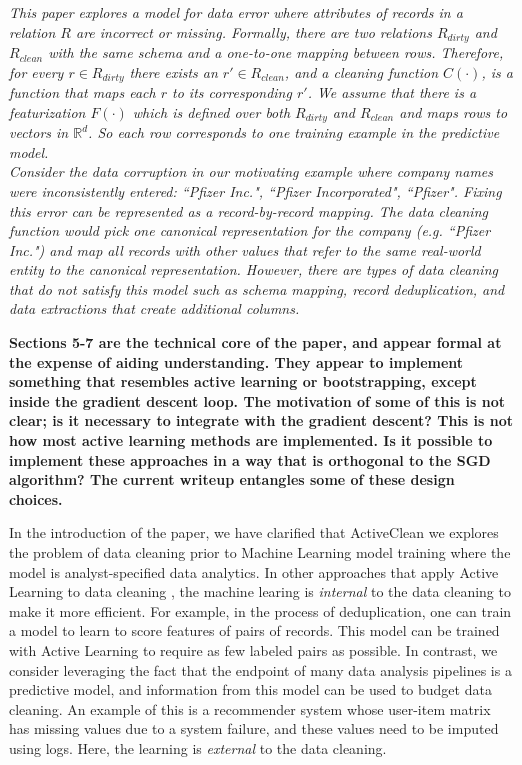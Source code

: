 \emph{This paper explores a model for data error where attributes of records in a relation $R$ are incorrect or missing.
Formally, there are two relations $R_{dirty}$ and $R_{clean}$ with the same schema and a one-to-one mapping between rows.
Therefore, for every $r \in R_{dirty}$ there exists an $r' \in R_{clean}$, and a cleaning function $C(\cdot)$, is a function that maps each $r$ to its corresponding $r'$.
We assume that there is a featurization $F(\cdot)$ which is defined over both $R_{dirty}$ and $R_{clean}$ and maps rows to vectors in $\mathbb{R}^d$.
So each row corresponds to one training example in the predictive model.\\
Consider the data corruption in our motivating example where company names were inconsistently entered: ``Pfizer Inc.", ``Pfizer Incorporated", ``Pfizer".
Fixing this error can be represented as a record-by-record mapping.
The data cleaning function would pick one canonical representation for the company (e.g. ``Pfizer Inc.") and map all records with other values that refer to the same real-world entity to the canonical representation.
However, there are types of data cleaning that do not satisfy this model such as schema mapping, record deduplication, and data extractions that create additional columns.}

\vspace{0.25em}

\textbf{Sections 5-7 are the technical core of the paper, and appear formal at the expense of aiding understanding. They appear to implement something that resembles active learning or bootstrapping, except inside the gradient descent loop. The motivation of some of this is not clear; is it necessary to integrate with the gradient descent? This is not how most active learning methods are implemented. Is it possible to implement these approaches in a way that is orthogonal to the SGD algorithm? The current writeup entangles some of these design choices.} 

In the introduction of the paper, we have clarified that ActiveClean we explores the problem of data cleaning prior to Machine Learning model training where the model is analyst-specified data analytics. In other approaches that apply Active Learning to data cleaning \cite{gokhale2014corleone, DBLP:journals/pvldb/YakoutENOI11, yakout2013don}, the machine learing is \emph{internal} to the data cleaning to make it more efficient. For example, in the process of deduplication, one can train a model to learn to score features of pairs of records. 
This model can be trained with Active Learning to require as few labeled pairs as possible.
 In contrast, we consider leveraging the fact that the endpoint of many data analysis pipelines is a predictive model, and information from this model can be used to budget data cleaning.
An example of this is a recommender system whose user-item matrix has missing values due to a system failure, and these values need to be imputed using logs.
Here, the learning is \emph{external} to the data cleaning. 

